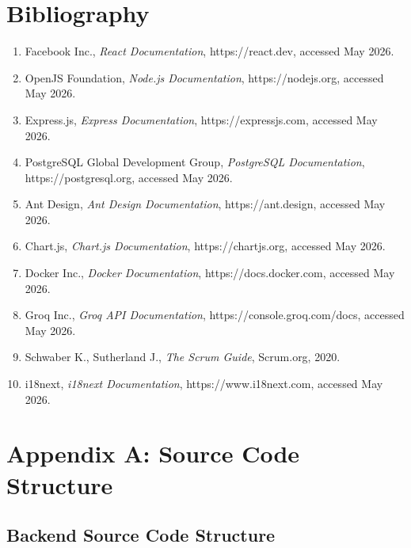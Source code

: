 \documentclass[12pt,a4paper]{report}
\begin{document}
\chapter*{Bibliography}

\begin{enumerate}
    \item[{[1]}] Facebook Inc., \textit{React Documentation}, https://react.dev, accessed May 2026.
    \item[{[2]}] OpenJS Foundation, \textit{Node.js Documentation}, https://nodejs.org, accessed May 2026.
    \item[{[3]}] Express.js, \textit{Express Documentation}, https://expressjs.com, accessed May 2026.
    \item[{[4]}] PostgreSQL Global Development Group, \textit{PostgreSQL Documentation}, https://postgresql.org, accessed May 2026.
    \item[{[5]}] Ant Design, \textit{Ant Design Documentation}, https://ant.design, accessed May 2026.
    \item[{[6]}] Chart.js, \textit{Chart.js Documentation}, https://chartjs.org, accessed May 2026.
    \item[{[7]}] Docker Inc., \textit{Docker Documentation}, https://docs.docker.com, accessed May 2026.
    \item[{[8]}] Groq Inc., \textit{Groq API Documentation}, https://console.groq.com/docs, accessed May 2026.
    \item[{[9]}] Schwaber K., Sutherland J., \textit{The Scrum Guide}, Scrum.org, 2020.
    \item[{[10]}] i18next, \textit{i18next Documentation}, https://www.i18next.com, accessed May 2026.
\end{enumerate}

\chapter*{Appendix A: Source Code Structure}

\section*{Backend Source Code Structure}
\end{document}
